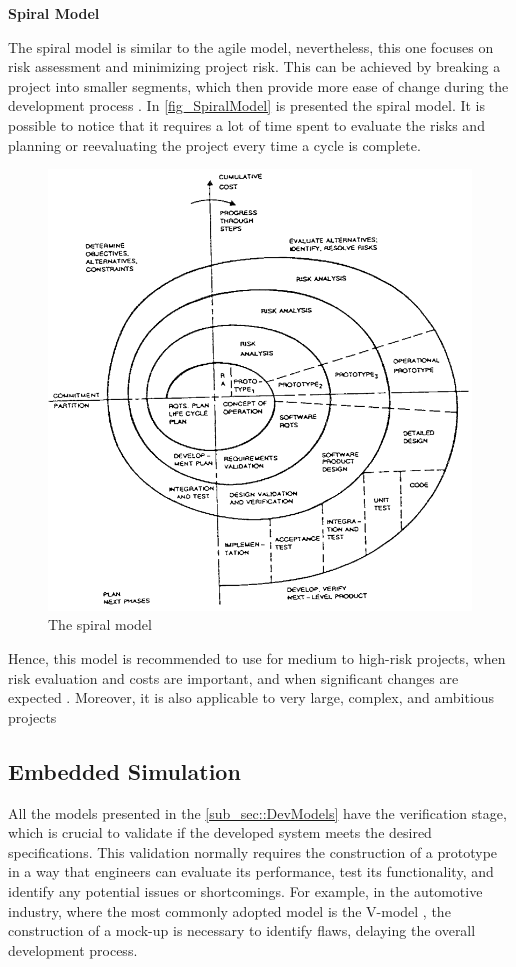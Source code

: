 \textbf{Spiral Model}
\newline

The spiral model is similar to the agile model, nevertheless, this one focuses on risk assessment and minimizing project risk. This can be achieved by breaking a project into smaller segments, which then provide more ease of change during the development process \cite{SpiralModel2}. In \autoref{fig_SpiralModel} is presented the spiral model. It is possible to notice that it requires a lot of time spent to evaluate the risks and planning or reevaluating the project every time a cycle is complete.

\begin{figure}[H]
	\centering
 	\includegraphics[width=0.5\linewidth]{Images/SpiralModel.png}
 	\caption{The spiral model \cite{SpiralModel3}}
	 \label{fig_SpiralModel}
\end{figure}

Hence, this model is recommended to use for medium to high-risk projects, when risk evaluation 
and costs are important, and when significant changes are expected \cite{SpiralModel2}. Moreover, it is also applicable to very large, complex, and ambitious projects \cite{SpiralModel3}


\subsection{Embedded Simulation}
\label{subSec::EmbeddedSim}

All the models presented in the \autoref{sub_sec::DevModels} have the verification stage, which is crucial to validate if the developed system meets the desired specifications. This validation normally requires the construction of a prototype in a way that engineers can evaluate its performance, test its functionality, and identify any potential issues or shortcomings. For example, in the automotive industry, where the most commonly adopted model is the V-model \cite{liu2016incremental}, the construction of a mock-up is necessary to identify flaws, delaying the overall development process. 

